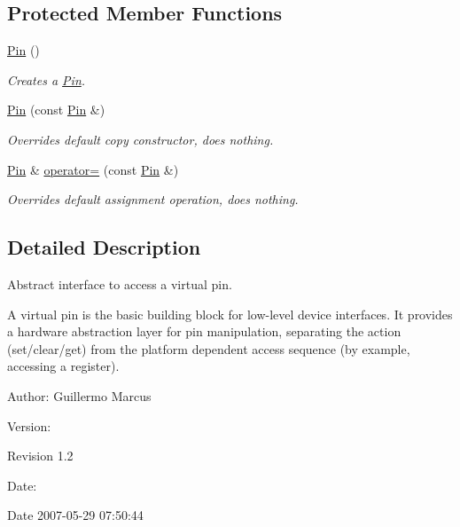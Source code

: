 \subsection*{Protected Member Functions}
\begin{CompactItemize}
\item 
\hyperlink{classmprace_1_1Pin_b0}{Pin} ()
\begin{CompactList}\small\item\em Creates a \hyperlink{classmprace_1_1Pin}{Pin}. \item\end{CompactList}\item 
\hyperlink{classmprace_1_1Pin_b1}{Pin} (const \hyperlink{classmprace_1_1Pin}{Pin} \&)
\begin{CompactList}\small\item\em Overrides default copy constructor, does nothing. \item\end{CompactList}\item 
\hyperlink{classmprace_1_1Pin}{Pin} \& \hyperlink{classmprace_1_1Pin_b2}{operator=} (const \hyperlink{classmprace_1_1Pin}{Pin} \&)
\begin{CompactList}\small\item\em Overrides default assignment operation, does nothing. \item\end{CompactList}\end{CompactItemize}


\subsection{Detailed Description}
Abstract interface to access a virtual pin. 

A virtual pin is the basic building block for low-level device interfaces. It provides a hardware abstraction layer for pin manipulation, separating the action (set/clear/get) from the platform dependent access sequence (by example, accessing a register).

\begin{Desc}
\item[Author:]Guillermo Marcus \end{Desc}
\begin{Desc}
\item[Version:]\begin{Desc}
\item[Revision]1.2 \end{Desc}
\end{Desc}
\begin{Desc}
\item[Date:]\begin{Desc}
\item[Date]2007-05-29 07:50:44 \end{Desc}
\end{Desc}




